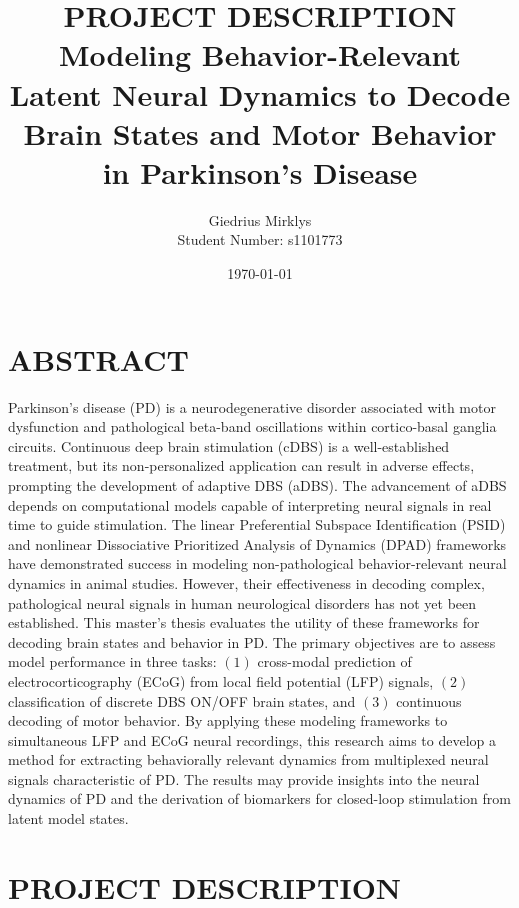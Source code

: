 \documentclass[12pt, a4paper]{article}
\begin{document}
\title{\textbf{PROJECT DESCRIPTION} \\ \vspace{1.5em} \large Modeling Behavior-Relevant Latent Neural Dynamics to Decode Brain States and Motor Behavior in Parkinson’s Disease}
\author{Giedrius Mirklys \\
    \normalsize{Student Number: s1101773}}
\date{\today} %

\maketitle
\RaggedRight


\section{ABSTRACT}
Parkinson’s disease (PD) is a neurodegenerative disorder associated with motor dysfunction and pathological beta-band oscillations within cortico-basal ganglia circuits. Continuous deep brain stimulation (cDBS) is a well-established treatment, but its non-personalized application can result in adverse effects, prompting the development of adaptive DBS (aDBS). The advancement of aDBS depends on computational models capable of interpreting neural signals in real time to guide stimulation. The linear Preferential Subspace Identification (PSID) and nonlinear Dissociative Prioritized Analysis of Dynamics (DPAD) frameworks have demonstrated success in modeling non-pathological behavior-relevant neural dynamics in animal studies. However, their effectiveness in decoding complex, pathological neural signals in human neurological disorders has not yet been established. This master’s thesis evaluates the utility of these frameworks for decoding brain states and behavior in PD. The primary objectives are to assess model performance in three tasks: $(1)$ cross-modal prediction of electrocorticography (ECoG) from local field potential (LFP) signals, $(2)$ classification of discrete DBS ON/OFF brain states, and $(3)$ continuous decoding of motor behavior. By applying these modeling frameworks to simultaneous LFP and ECoG neural recordings, this research aims to develop a method for extracting behaviorally relevant dynamics from multiplexed neural signals characteristic of PD. The results may provide insights into the neural dynamics of PD and the derivation of biomarkers for closed-loop stimulation from latent model states.

\section{PROJECT DESCRIPTION}
\end{document}
